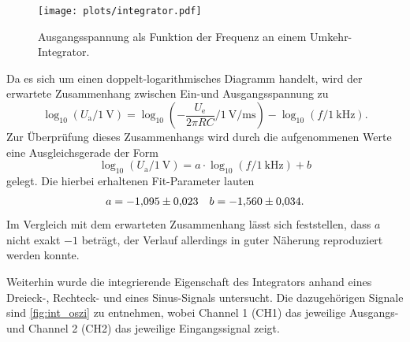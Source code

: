 \begin{figure}[H]
  \centering
  \texttt{[image: plots/integrator.pdf]}
  \caption{Ausgangsspannung als Funktion der Frequenz an einem Umkehr-Integrator.}
  \label{fig:int_messung}
\end{figure}
Da es sich um einen doppelt-logarithmisches Diagramm handelt, wird der erwartete Zusammenhang zwischen Ein-und Ausgangsspannung zu
\begin{equation*}
  \log_{10} (U_\mathrm{a}/\SI{1}{\volt}) = \log_{10} (- \frac{U_\mathrm{e}}{2\pi R C}/\SI{1}{\volt\per\milli\second}) - \log_{10} (f/\SI{1}{\kilo\hertz}).
\end{equation*}
Zur Überprüfung dieses Zusammenhangs wird durch die aufgenommenen Werte eine Ausgleichsgerade der Form
\begin{equation}
  \log_{10} (U_\mathrm{a}/\SI{1}{\volt}) = a \cdot \log_{10} (f/\SI{1}{\kilo\hertz}) + b
  \label{eq:fit_int}
\end{equation}
gelegt. Die hierbei erhaltenen Fit-Parameter lauten
\begin{align*}
  a = \num{-1.095 \pm 0.023} && b = \num{-1.560 \pm 0.034}.
\end{align*}
Im Vergleich mit dem erwarteten Zusammenhang lässt sich feststellen, dass $a$ nicht exakt $-1$ beträgt, der Verlauf allerdings in guter Näherung reproduziert werden konnte.

Weiterhin wurde die integrierende Eigenschaft des Integrators anhand eines Dreieck-, Rechteck- und eines Sinus-Signals untersucht. Die dazugehörigen Signale sind \autoref{fig:int_oszi} zu entnehmen, wobei Channel 1 (CH1) das jeweilige Ausgangs- und Channel 2 (CH2) das jeweilige Eingangssignal zeigt.

